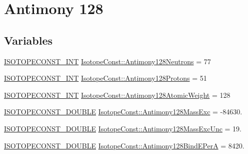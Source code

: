 \hypertarget{group___isotope_const-_antimony-_sb128}{}\section{Antimony 128}
\label{group___isotope_const-_antimony-_sb128}
\subsection*{Variables}
\begin{DoxyCompactItemize}
\item 
\mbox{\hyperlink{group___isotope_const-_macros_ga5f18360b3e99483a35c32d789e62621c}{I\+S\+O\+T\+O\+P\+E\+C\+O\+N\+S\+T\+\_\+\+I\+NT}} \mbox{\hyperlink{group___isotope_const-_antimony-_sb128_ga6233333ff9c56defb1a7d881cd2b0aa0}{Isotope\+Const\+::\+Antimony128\+Neutrons}} = 77
\item 
\mbox{\hyperlink{group___isotope_const-_macros_ga5f18360b3e99483a35c32d789e62621c}{I\+S\+O\+T\+O\+P\+E\+C\+O\+N\+S\+T\+\_\+\+I\+NT}} \mbox{\hyperlink{group___isotope_const-_antimony-_sb128_ga0d007eee71f185a7c3af4851029e61eb}{Isotope\+Const\+::\+Antimony128\+Protons}} = 51
\item 
\mbox{\hyperlink{group___isotope_const-_macros_ga5f18360b3e99483a35c32d789e62621c}{I\+S\+O\+T\+O\+P\+E\+C\+O\+N\+S\+T\+\_\+\+I\+NT}} \mbox{\hyperlink{group___isotope_const-_antimony-_sb128_ga0f36020e3ac1639253be32dc1c79e168}{Isotope\+Const\+::\+Antimony128\+Atomic\+Weight}} = 128
\item 
\mbox{\hyperlink{group___isotope_const-_macros_ga8f45a7272ce02c0b4c65c44636ed719a}{I\+S\+O\+T\+O\+P\+E\+C\+O\+N\+S\+T\+\_\+\+D\+O\+U\+B\+LE}} \mbox{\hyperlink{group___isotope_const-_antimony-_sb128_ga106ad8e8ebcd96b80b5d4098316411ef}{Isotope\+Const\+::\+Antimony128\+Mass\+Exc}} = -\/84630.
\item 
\mbox{\hyperlink{group___isotope_const-_macros_ga8f45a7272ce02c0b4c65c44636ed719a}{I\+S\+O\+T\+O\+P\+E\+C\+O\+N\+S\+T\+\_\+\+D\+O\+U\+B\+LE}} \mbox{\hyperlink{group___isotope_const-_antimony-_sb128_ga35642ce3c1e40d17cb09e2e5e6a7203e}{Isotope\+Const\+::\+Antimony128\+Mass\+Exc\+Unc}} = 19.
\item 
\mbox{\hyperlink{group___isotope_const-_macros_ga8f45a7272ce02c0b4c65c44636ed719a}{I\+S\+O\+T\+O\+P\+E\+C\+O\+N\+S\+T\+\_\+\+D\+O\+U\+B\+LE}} \mbox{\hyperlink{group___isotope_const-_antimony-_sb128_ga7526b84c30d47e1a628a5e9fa8553797}{Isotope\+Const\+::\+Antimony128\+Bind\+E\+PerA}} = 8420.
\item 

\end{DoxyCompactItemize}
